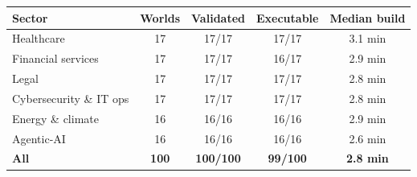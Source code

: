 \begin{tabular}{lcccc}
\toprule
Sector & Worlds & Validated & Executable & Median build \\
\midrule
Healthcare & 17 & 17/17 & 17/17 & 3.1 min \\
Financial services & 17 & 17/17 & 16/17 & 2.9 min \\
Legal & 17 & 17/17 & 17/17 & 2.8 min \\
Cybersecurity \& IT ops & 17 & 17/17 & 17/17 & 2.8 min \\
Energy \& climate & 16 & 16/16 & 16/16 & 2.9 min \\
Agentic-AI & 16 & 16/16 & 16/16 & 2.6 min \\
\midrule
\textbf{All} & \textbf{100} & \textbf{100/100} & \textbf{99/100} & \textbf{2.8 min} \\
\bottomrule
\end{tabular}
